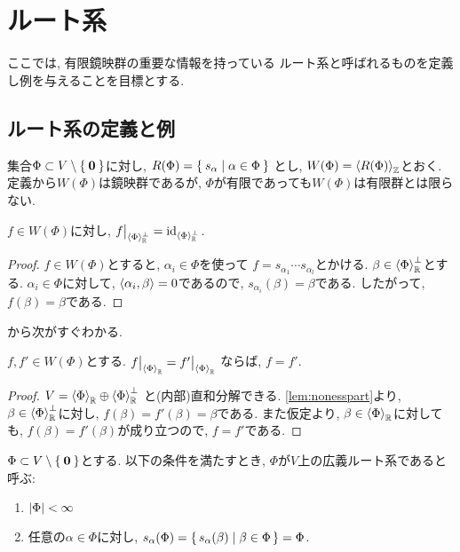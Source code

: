 \chapter{ルート系}

ここでは,
有限鏡映群の重要な情報を持っている
ルート系と呼ばれるものを定義し例を与えることを目標とする.

\section{ルート系の定義と例}

集合$\Phi\subset V\setminus \Set{\boldsymbol{0}}$に対し,
$R(\Phi)=\Set{s_\alpha | \alpha \in \Phi}$
とし,
$W(\Phi)=\Braket{R(\Phi)}_{\mathbb{Z}}$とおく.
定義から$W(\Phi)$は鏡映群であるが,
$\Phi$が有限であっても$W(\Phi)$は有限群とは限らない.

\begin{lemma}
  \label{lem:nonesspart}
  $f\in W(\Phi)$に対し,
  $f\bigr|_{\Braket{\Phi}_{\mathbb{R}}^{\perp}}=\operatorname{id}_{\Braket{\Phi}_{\mathbb{R}}^{\perp}}$.
\end{lemma}
\begin{proof}
  $f\in W(\Phi)$とすると,
  $\alpha_i\in \Phi$を使って
  $f=s_{\alpha_1}\cdots s_{\alpha_l}$とかける.
  $\beta\in \Braket{\Phi}_{\mathbb{R}}^{\perp}$とする.
  $\alpha_i\in \Phi$に対して,
  $\Braket{\alpha_i,\beta}=0$であるので,
  $s_{\alpha_i}(\beta)=\beta$である.
  したがって, 
  $f(\beta)=\beta$である.
\end{proof}

から次がすぐわかる.
\begin{lemma}
  \label{lem:esspart:eq}
  $f,f'\in W(\Phi)$とする.
  $f\bigr|_{\Braket{\Phi}_{\mathbb{R}}}=f'\bigr|_{\Braket{\Phi}_{\mathbb{R}}}$
  ならば,
  $f=f'$.
\end{lemma}
\begin{proof}
  $V=\Braket{\Phi}_{\mathbb{R}}\oplus \Braket{\Phi}_{\mathbb{R}}^\perp$
  と(内部)直和分解できる.
  \cref{lem:nonesspart}より,
  $\beta\in \Braket{\Phi}_{\mathbb{R}}^\perp$に対し,
  $f(\beta)=f'(\beta)=\beta$である.
  また仮定より, $\beta\in \Braket{\Phi}_{\mathbb{R}}$に対しても,
  $f(\beta)=f'(\beta)$が成り立つので,
  $f=f'$である.  
\end{proof}


\begin{definition}
  $\Phi \subset V \setminus \Set{\boldsymbol{0}}$とする.
  以下の条件を満たすとき, $\Phi$が$V$上の広義ルート系であると呼ぶ:
  \begin{enumerate}
  \item $\left|\Phi\right|<\infty$
  \item 任意の$\alpha \in \Phi$に対し,
    $s_\alpha (\Phi) = \set{s_\alpha(\beta)|\beta\in \Phi}=\Phi$.
  \end{enumerate}
\end{definition}

